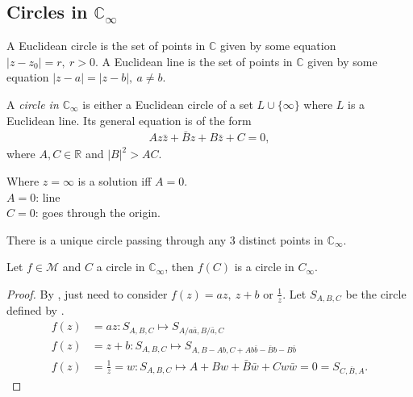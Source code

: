 \subsection{Circles in $\mathbb{C}_\infty$}

A Euclidean circle is the set of points in $\mathbb{C}$ given by some equation $|z - z_0| = r,\ r > 0$.
A Euclidean line is the set of points in $\mathbb{C}$ given by some equation $|z - a| = |z - b|,\ a \neq b$.

\begin{definition}
    A \emph{circle in $\mathbb{C}_\infty$} is either a Euclidean circle of a set $L \cup \{\infty\}$ where $L$ is a Euclidean line.
    Its general equation is of the form 
    \begin{align}
        Az\bar z + \bar Bz + B\bar z + C = 0, \label{eq:circle}
    \end{align} 
    where $A, C \in \mathbb{R}$ and $|B|^2 > AC$.
\end{definition}

Where $z = \infty$ is a solution iff $A = 0$. \\
$A = 0$: line \\
$C = 0$: goes through the origin.

There is a unique circle passing through any 3 distinct points in $\mathbb{C}_\infty$.

\begin{theorem} \label{thm:18}
    Let $f \in \mathcal{M}$ and $C$ a circle in $\mathbb{C}_\infty$, then $f(C)$ is a circle in $C_\infty$.
\end{theorem} 

\begin{proof}
    By , just need to consider 
    $f(z) = az,\ z + b \text{ or } \frac{1}{z}.$
    Let $S_{A, B, C}$ be the circle defined by .
    \begin{align*}
        f(z) &= az : S_{A, B, C} \mapsto S_{A / a \bar{a}, B / \bar{a}, C} \\
        f(z) &= z + b: S_{A, B, C} \mapsto S_{A, B - Ab, C + A b \bar{b} - \bar{B}b - B \bar{b}} \\
        f(z) &= \frac{1}{z} = w: S_{A, B, C} \mapsto A + B w + \bar{B} \bar{w} + C w \bar{w} = 0 = S_{C, \bar{B}, A}.
    \end{align*} 
\end{proof} 

